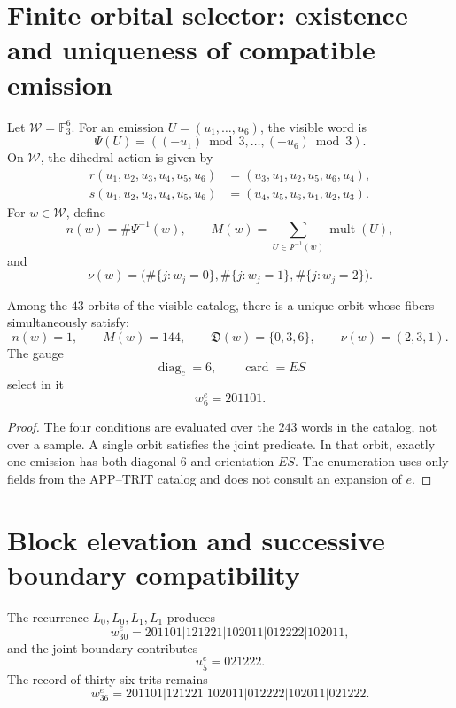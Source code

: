 
\label{gfp:b:chap:biografia-completa-e}

\section{Finite orbital selector: existence and uniqueness of compatible emission}

Let \(\mathcal W=\mathbb F_3^6\). For an emission
\(U=(u_1,\ldots,u_6)\), the visible word is
\[
 \Psi(U)=((-u_1)\bmod3,\ldots,(-u_6)\bmod3).
\]
On \(\mathcal W\), the dihedral action is given by
\[
\begin{aligned}
 r(u_1,u_2,u_3,u_4,u_5,u_6)
 &=(u_3,u_1,u_2,u_5,u_6,u_4),\\
 s(u_1,u_2,u_3,u_4,u_5,u_6)
 &=(u_4,u_5,u_6,u_1,u_2,u_3).
\end{aligned}
\]
For \(w\in\mathcal W\), define
\[
 n(w)=\#\Psi^{-1}(w),
 \qquad
 M(w)=\sum_{U\in\Psi^{-1}(w)}\operatorname{mult}(U),
\]
and
\[
 \nu(w)=
 \bigl(
 \#\{j:w_j=0\},
 \#\{j:w_j=1\},
 \#\{j:w_j=2\}
 \bigr).
\]

\begin{theorem}
\label{gfp:b:thm:seleccion-estructural-e}
Among the \(43\) orbits of the visible catalog, there is a unique orbit whose
fibers simultaneously satisfy:
\[
 n(w)=1,\qquad M(w)=144,\qquad
 \mathfrak D(w)=\{0,3,6\},\qquad
 \nu(w)=(2,3,1).
\]
The gauge
\[
 \operatorname{diag}_c=6,
 \qquad \operatorname{card}=ES
\]
select in it
\[
 \boxed{w_6^e=201101.}
\]
\end{theorem}

\begin{proof}
The four conditions are evaluated over the \(243\) words in the catalog, not over a sample. A single orbit satisfies the joint predicate. In that orbit, exactly one emission has both diagonal \(6\) and orientation \(ES\). The enumeration uses only fields from the APP--TRIT catalog and does not consult an expansion of \(e\).
\end{proof}

\section{Block elevation and successive boundary compatibility}

The recurrence \(L_0,L_0,L_1,L_1\) produces
\[
 w_{30}^{e}
 =201101|121221|102011|012222|102011,
\]
and the joint boundary contributes
\[
 u_5^e=021222.
\]
The record of thirty-six trits remains
\[
 w_{36}^{e}
 =201101|121221|102011|012222|102011|021222.
\]

